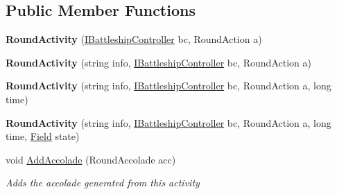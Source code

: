 \subsection*{Public Member Functions}
\begin{DoxyCompactItemize}
\item 
\hypertarget{class_m_b_c_1_1_core_1_1_round_log_1_1_round_activity_a85d5845b665c551e2d9d6d2b7096397c}{{\bfseries Round\-Activity} (\hyperlink{interface_m_b_c_1_1_core_1_1_i_battleship_controller}{I\-Battleship\-Controller} bc, Round\-Action a)}\label{class_m_b_c_1_1_core_1_1_round_log_1_1_round_activity_a85d5845b665c551e2d9d6d2b7096397c}

\item 
\hypertarget{class_m_b_c_1_1_core_1_1_round_log_1_1_round_activity_a7afc1188cd7cdb06b33fa1bcb8302451}{{\bfseries Round\-Activity} (string info, \hyperlink{interface_m_b_c_1_1_core_1_1_i_battleship_controller}{I\-Battleship\-Controller} bc, Round\-Action a)}\label{class_m_b_c_1_1_core_1_1_round_log_1_1_round_activity_a7afc1188cd7cdb06b33fa1bcb8302451}

\item 
\hypertarget{class_m_b_c_1_1_core_1_1_round_log_1_1_round_activity_af43cf874695e2b650549e38fbdcb3e39}{{\bfseries Round\-Activity} (string info, \hyperlink{interface_m_b_c_1_1_core_1_1_i_battleship_controller}{I\-Battleship\-Controller} bc, Round\-Action a, long time)}\label{class_m_b_c_1_1_core_1_1_round_log_1_1_round_activity_af43cf874695e2b650549e38fbdcb3e39}

\item 
\hypertarget{class_m_b_c_1_1_core_1_1_round_log_1_1_round_activity_a8dcb83926672689b58a95a6fa67f0416}{{\bfseries Round\-Activity} (string info, \hyperlink{interface_m_b_c_1_1_core_1_1_i_battleship_controller}{I\-Battleship\-Controller} bc, Round\-Action a, long time, \hyperlink{class_m_b_c_1_1_core_1_1_field}{Field} state)}\label{class_m_b_c_1_1_core_1_1_round_log_1_1_round_activity_a8dcb83926672689b58a95a6fa67f0416}

\item 
\hypertarget{class_m_b_c_1_1_core_1_1_round_log_1_1_round_activity_a46fdc053d4d185227893de422d2a4ba0}{void \hyperlink{class_m_b_c_1_1_core_1_1_round_log_1_1_round_activity_a46fdc053d4d185227893de422d2a4ba0}{Add\-Accolade} (Round\-Accolade acc)}\label{class_m_b_c_1_1_core_1_1_round_log_1_1_round_activity_a46fdc053d4d185227893de422d2a4ba0}

\begin{DoxyCompactList}\small\item\em Adds the accolade generated from this activity\end{DoxyCompactList}\end{DoxyCompactItemize}
